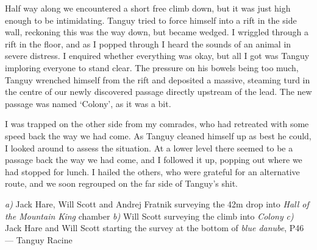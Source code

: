 Half way along we encountered a short free climb down, but it was just high enough to be intimidating. Tanguy tried to force himself into a rift in the side wall, reckoning this was the way down, but became wedged. I wriggled through a rift in the floor, and as I popped through I heard the sounds of an animal in severe distress. I enquired whether everything was okay, but all I got was Tanguy imploring everyone to stand clear. The pressure on his bowels being too much, Tanguy wrenched himself from the rift and deposited a massive, steaming turd in the centre of our newly discovered passage directly upstream of the lead. The new passage was named ‘Colony’, as it was a bit.
 
I was trapped on the other side from my comrades, who had retreated with some speed back the way we had come. As Tanguy cleaned himself up as best he could, I looked around to assess the situation. At a lower level there seemed to be a passage back the way we had come, and I followed it up, popping out where we had stopped for lunch. I hailed the others, who were grateful for an alternative route, and we soon regrouped on the far side of Tanguy’s shit.

\begin{pagefigure}
    \centering
    \begin{subfigure}[t]{0.393\textwidth}
        \centering
        \caption{} \label{Hall of the Mountain King}
    \end{subfigure}
    \hfill
    \begin{subfigure}[t]{0.59\textwidth}
        \centering
        \caption{} \label{Colony}
    \end{subfigure}

    \vspace{0.3cm}
    \begin{subfigure}[t]{\textwidth}
    \centering
        \caption{} \label{Bottom of Blue Danube}
    \end{subfigure}
    
    \caption{
    \emph{a)} Jack Hare, Will Scott and Andrej Fratnik surveying the 42m drop into \emph{Hall of the Mountain King} chamber
    \emph{b)} Will Scott surveying the climb into \emph{Colony}
    \emph{c)} Jack Hare and Will Scott starting the survey at the bottom of \emph{blue danube}, P46 --- Tanguy Racine }

\end{pagefigure}


